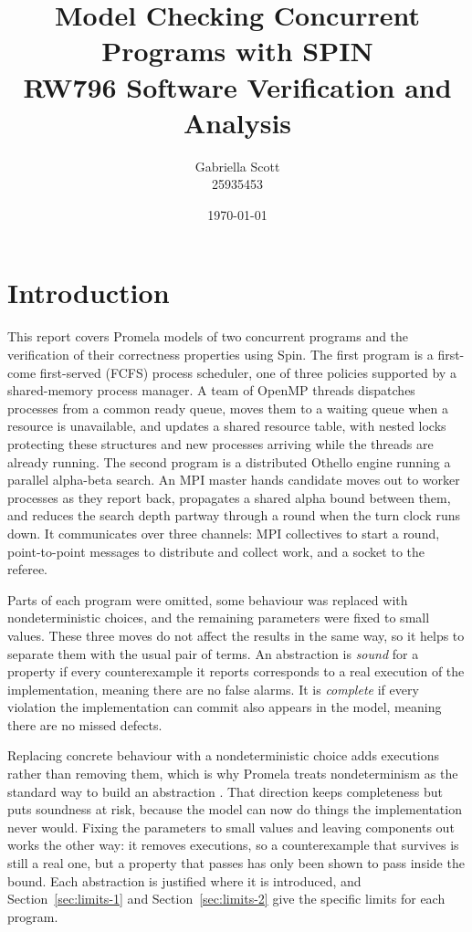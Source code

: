 \documentclass[10pt,a4paper]{article}
\title{Model Checking Concurrent Programs with SPIN\\
       \large RW796 Software Verification and Analysis}
\author{Gabriella Scott \\ 25935453}
\date{\today}
\begin{document}
\maketitle

\section*{Introduction}

This report covers Promela models of two concurrent programs and the
verification of their correctness properties using Spin. The first
program is a first-come first-served (FCFS) process scheduler, one of
three policies supported by a shared-memory process manager. A team of
OpenMP threads dispatches processes from a common ready queue, moves
them to a waiting queue when a resource is unavailable, and updates a
shared resource table, with nested locks protecting these structures
and new processes arriving while the threads are already running. The
second program is a distributed Othello engine running a parallel
alpha-beta search. An MPI master hands candidate moves out to worker
processes as they report back, propagates a shared alpha bound between
them, and reduces the search depth partway through a round when the
turn clock runs down. It communicates over three channels: MPI
collectives to start a round, point-to-point messages to distribute and
collect work, and a socket to the referee.

Parts of each program were omitted, some behaviour was replaced with
nondeterministic choices, and the remaining parameters were fixed to small
values. These three moves do not affect the results in the same way, so it
helps to separate them with the usual pair of terms. An abstraction is
\emph{sound} for a property if every counterexample it reports corresponds to
a real execution of the implementation, meaning there are no false alarms. It
is \emph{complete} if every violation the implementation can commit also
appears in the model, meaning there are no missed defects.

Replacing concrete behaviour with a nondeterministic choice adds executions
rather than removing them, which is why Promela treats nondeterminism as the
standard way to build an abstraction \cite{inggs_promela}. That direction
keeps completeness but puts soundness at risk, because the model can now do
things the implementation never would. Fixing the parameters to small values
and leaving components out works the other way: it removes executions, so a
counterexample that survives is still a real one, but a property that passes
has only been shown to pass inside the bound. Each abstraction is justified where it is introduced, and
Section~\ref{sec:limits-1} and Section~\ref{sec:limits-2} give the specific
limits for each program.
\end{document}
